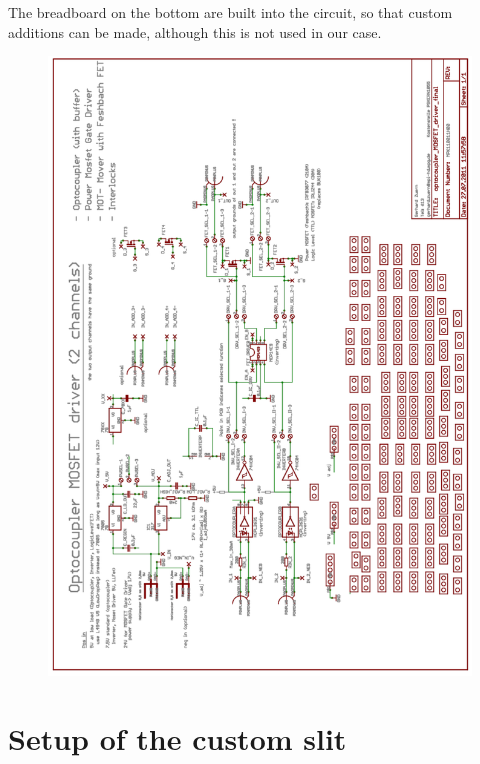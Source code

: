 The breadboard on the bottom are built into the circuit, so that custom additions can be made, although this is not used in our case.

\begin{figure}[htb]
	\begin{center}
		\includegraphics[width=\textwidth]{drafts/shutter_circuit.pdf}
	\end{center}
\end{figure}

\chapter{Setup of the custom slit}


